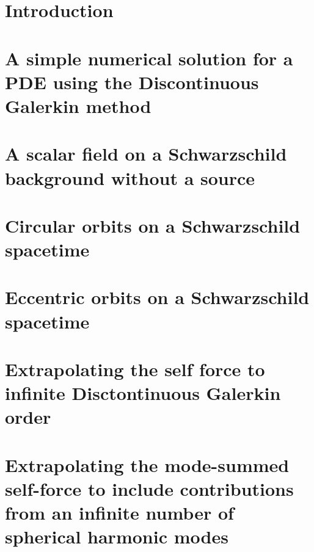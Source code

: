 \documentclass[12pt,letterpaper]{lsuetd}
\begin{document}
\singlespacing
\setlength{\textfloatsep}{12pt plus 2pt minus 2pt}
\setlength{\intextsep}{6pt plus 2pt minus 2pt}
\chapter{Introduction}
\doublespacing

\pagebreak
\singlespacing
\chapter{A simple numerical solution for a PDE using the Discontinuous Galerkin method}
\doublespacing

\pagebreak
\singlespacing
\chapter{A scalar field on a Schwarzschild background without a source}
\doublespacing

\pagebreak
\singlespacing
\chapter{Circular orbits on a Schwarzschild spacetime}
\doublespacing

\label{circularorbit}
\pagebreak
\singlespacing
\chapter{Eccentric orbits on a Schwarzschild spacetime}
\doublespacing

\label{ellipticalorb}
\pagebreak
\singlespacing
\chapter{Extrapolating the self force to infinite Disctontinuous Galerkin order}
\doublespacing

\pagebreak
\singlespacing
\chapter{Extrapolating the mode-summed self-force to include contributions from an infinite number of spherical harmonic modes}
\doublespacing

\label{lmode}
\pagebreak
\singlespacing
\end{document}
